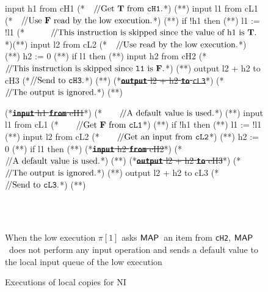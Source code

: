 \documentclass[10pt,a4paper,oneside]{article}
\def\VTRUE{\ensuremath{\textbf{T}}}
\def\VFALSE{\ensuremath{\textbf{F}}}
\def\sanserif#1{\ensuremath{\sf #1}}
\def\MAP{\ensuremath{\sanserif{MAP}}}
\def\Prog{\ensuremath{\pi}}
\def\Progl#1{\ensuremath{\Prog[#1]}}
\def\ctab{}
\def\icomment#1{\ensuremath{\ctab/\!/\textnormal{#1}}}
\def\figdesc#1{
\noindent
\centering
\begin{minipage}{0.95\columnwidth}
\vspace{3pt}
\begin{footnotesize}
#1
\end{footnotesize}
\end{minipage}
}
\def\linecode#1{{\texttt{#1}}}
\def\linecodeb#1{{\texttt{\bfseries #1}}}
\begin{document}
\begin{figure}[!t]
\begin{lrbox}{\mylistingbox}\begin{minipage}{\columnwidth}\begin{javascript}
input h1 from cH1 (*~~\icomment{Get \VTRUE\ from \linecode{cH1}.}*) (*\label{example:NI:HEx:l1}*)
input l1 from cL1 (*~~\icomment{Use \VFALSE\ read by the low execution.}*) (*\label{example:NI:HEx:l2}*)
if !h1 then       (*\label{example:NI:HEx:l3}*)
    l1 := !l1     (*~~~~~~\icomment{This instruction is skipped since the value of h1 is \VTRUE.}*)(*\label{example:NI:HEx:l4}*)
input l2 from cL2 (*~~\icomment{Use  read by the low execution.}*) (*\label{example:NI:HEx:l5}*)
h2 := 0           (*\label{example:NI:HEx:l6}*)
if l1 then        (*\label{example:NI:HEx:l7}*)
    input h2 from cH2 (*\icomment{This instruction is skipped since \linecode{l1} is \VFALSE.}*)   (*\label{example:NI:HEx:l8}*)
output l2 + h2 to cH3 (*\icomment{Send  to \linecode{cH3}.}*)  (*\label{example:NI:HEx:l9}*)
(*\sout{\linecodeb{output} l2 + h2 \linecodeb{to} \linecode{cL3}}*)  (*\icomment{The output is ignored.}*) (*\label{example:NI:HEx:l10}*)
\end{javascript}\end{minipage}\end{lrbox} \subfloat[The high execution \Progl{0}]{\label{fig:example:NI:execution:H}\usebox{\mylistingbox}}\begin{lrbox}{\mylistingbox}\begin{minipage}{\columnwidth}\begin{javascript}
(*\sout{\linecodeb{input} h1 \linecodeb{from} cH1}*) (*~~~~\icomment{A default value is used.}*) (*\label{example:NI:LEx:l1}*)
input l1 from cL1 (*~~~~\icomment{Get \VFALSE\ from \linecode{cL1}}*) (*\label{example:NI:LEx:l2}*)
if !h1 then (*\label{example:NI:LEx:l3}*)
    l1 := !l1 (*\label{example:NI:LEx:l4}*)
input l2 from cL2 (*~~~~\icomment{Get an input from \linecode{cL2}}*) (*\label{example:NI:LEx:l5}*)
h2 := 0 (*\label{example:NI:LEx:l6}*)
if l1 then  (*\label{example:NI:LEx:l7}*)
    (*\sout{\linecodeb{input} h2 \linecodeb{from} cH2}*) (*\icomment{A default value is used.}*) (*\label{example:NI:LEx:l8}*)
(*\sout{\linecodeb{output} l2 + h2 \linecodeb{to} cH3}*) (*\icomment{The output is ignored.}*) (*\label{example:NI:LEx:l9}*)
output l2 + h2 to cL3 (*\icomment{Send  to \linecode{cL3}.}*)  (*\label{example:NI:LEx:l10}*)
\end{javascript}\end{minipage}\end{lrbox} \\
\subfloat[The low execution \Progl{1}]{\label{fig:example:NI:execution:L}\usebox{\mylistingbox}}\\
\figdesc{When the low execution \Progl{1} asks \MAP\ an item from \linecode{cH2}, \MAP\ does not perform any input operation and sends a default value to the local input queue of the low execution}
\caption{Executions of local copies for NI}
\label{fig:example:execution:NI:HLUEx}
\end{figure}
\end{document}
